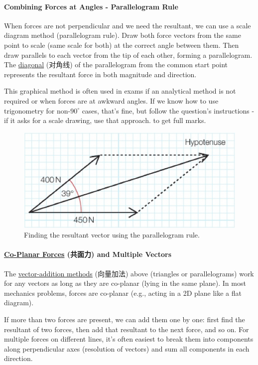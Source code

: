 \paragraph{Combining Forces at Angles - Parallelogram Rule}
When forces are not perpendicular and we need the resultant, we can use a scale diagram method (parallelogram rule). Draw both
force vectors from the same point to scale (same scale for both) at the correct angle between them. Then draw parallels to each
vector from the tip of each other, forming a parallelogram. The \underline{diagonal} (对角线) of the parallelogram from the common
start point represents the resultant force in both magnitude and direction. \par
This graphical method is often used in exams if an analytical method is not required or when forces are at awkward angles. If we
know how to use trigonometry for non-$90^\circ$ cases, that's fine, but follow the question's instructions - if it asks for a scale
drawing, use that approach. to get full marks.
\begin{figure}[H]
    \centering
    \includegraphics[scale=0.1]{Physics/1A/Images/1A-3-2.png}
    \caption{Finding the resultant vector using the parallelogram rule.}
\end{figure}

\paragraph{\underline{Co-Planar Forces} (共面力) and Multiple Vectors}
The \underline{vector-addition methods} (向量加法) above (triangles or parallelograms) work for any vectors as long as they are
co-planar (lying in the same plane). In most mechanics problems, forces are co-planar (e.g., acting in a 2D plane like a flat
diagram). \par
If more than two forces are present, we can add them one by one: first find the resultant of two forces, then add that resultant
to the next force, and so on. For multiple forces on different lines, it's often easiest to break them into components along
perpendicular axes (resolution of vectors) and sum all components in each direction.


